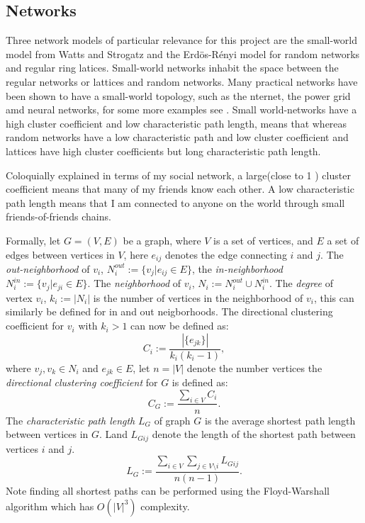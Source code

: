 %
\label{proposed}
\subsection{Networks}\label{proposed_networks}
Three network models of particular relevance for this project are the small-world model \cite{watts1998collective} from Watts and Strogatz and the Erd\"{o}s-R\'{e}nyi model for random networks \cite{erdos1960evolution} and regular ring latices. Small-world networks inhabit the space between the regular networks or lattices and random networks. Many practical networks have been shown to have a small-world topology, such as the nternet, the power grid amd neural networks,  for some more examples see \cite{albert2002statistical}. Small world-networks have a high cluster coefficient and low characteristic path length, means that  whereas random networks have a low characteristic path and low cluster coefficient and lattices have high cluster coefficients but long characteristic path length.

Coloquially explained in terms of my social network, a large(close to 1 ) cluster coefficient means that many of my friends know each other. A low characteristic path length means that I am connected to anyone on the world through small friends-of-friends chains.

Formally, let $G=(V, E)$ be a graph, where $V$ is a set of vertices, and $E$ a set of edges between vertices in $V$, here $e_{ij}$ denotes the edge connecting $i$ and $j$.  The \textit{out-neighborhood} of $v_i$, $N_i^{out}:=\{v_j|e_{ij}\in E\}$, the \textit{in-neighborhood} $N_i^{in}:=\{v_j|e_{ji}\in E\}$. The \textit{neighborhood} of $v_i$, $N_i:=N_i^{out}\cup N_i^{in}$. The \textit{degree} of vertex $v_i$, $k_i:=|N_i|$ is the number of vertices in the neighborhood of $v_i$, this can similarly be defined for in and out neigborhoods. The directional clustering coefficient for $v_i$ with $k_i>1$ can now be defined as:
$$C_i :=\frac{|\{e_{jk}\}|}{k_i(k_i-1)},$$
where $v_j,v_k\in N_i$ and $e_{jk}\in E$, let $n=|V|$ denote the number vertices the \textit{directional clustering coefficient} for $G$ is defined as:
$$C_G:=\frac{\sum_{i\in V} C_i}{n}.$$
The \textit{characteristic path length} $L_G$ of graph $G$ is the average shortest path length between vertices in $G$. Land  $L_{Gij}$ denote the length of the shortest path between vertices $i$ and $j$. 
$$L_G:= \frac{\sum_{i\in V} \sum_{j \in V\setminus i}L_{Gij}}{n(n-1)}.$$ 
Note finding all shortest paths can be performed using the Floyd-Warshall algorithm which has $O(|V|^3)$ complexity\cite{Floyd}.

